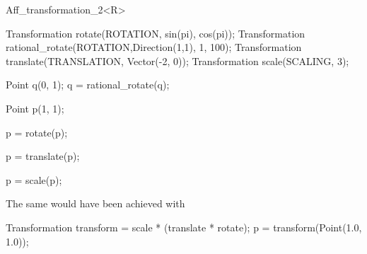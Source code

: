 \begin{ccRefClass}{Aff_transformation_2<R>}
\begin{cprog}
  Transformation rotate(ROTATION, sin(pi), cos(pi));
  Transformation rational_rotate(ROTATION,Direction(1,1), 1, 100);
  Transformation translate(TRANSLATION, Vector(-2, 0));
  Transformation scale(SCALING, 3);

  Point q(0, 1);
  q = rational_rotate(q); 

  Point p(1, 1);

  p = rotate(p); 

  p = translate(p); 

  p = scale(p);
\end{cprog} 

The same would have been achieved with

\begin{cprog}

  Transformation transform = scale * (translate * rotate);
  p = transform(Point(1.0, 1.0));
\end{cprog} 
\end{ccRefClass} 

